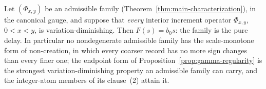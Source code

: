 \begin{proposition}\label{prop:vd-impossibility}
Let $(\Phi_{x,y})$ be an admissible family (Theorem~\ref{thm:main-characterization}), in
the canonical gauge, and suppose that \emph{every} interior increment operator
$\Phi_{x,y}$, $0 < x < y$, is variation-diminishing. Then $F(s) = b_0 s$: the family is
the pure delay. In particular no nondegenerate admissible family has the scale-monotone
form of non-creation, in which every coarser record has no more sign changes than every
finer one; the endpoint form of Proposition~\ref{prop:gamma-regularity} is the strongest
variation-diminishing property an admissible family can carry, and the integer-atom
members of its clause~(2) attain it.
\end{proposition}

